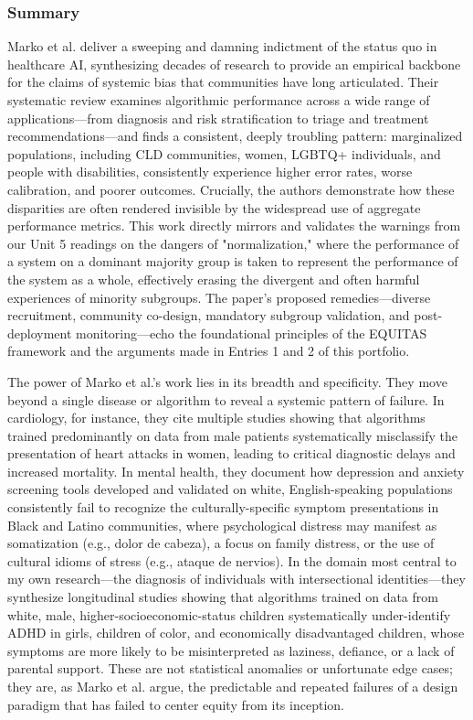 \documentclass[11pt,twoside]{article}
\begin{document}
\vspace{-0.3cm}
\subsubsection*{Summary}

\vspace{-0.3cm}
Marko et al. deliver a sweeping and damning indictment of the status quo in healthcare AI, synthesizing decades of research to provide an empirical backbone for the claims of systemic bias that communities have long articulated. Their systematic review examines algorithmic performance across a wide range of applications—from diagnosis and risk stratification to triage and treatment recommendations—and finds a consistent, deeply troubling pattern: marginalized populations, including CLD communities, women, LGBTQ+ individuals, and people with disabilities, consistently experience higher error rates, worse calibration, and poorer outcomes. Crucially, the authors demonstrate how these disparities are often rendered invisible by the widespread use of aggregate performance metrics. This work directly mirrors and validates the warnings from our Unit 5 readings on the dangers of "normalization," where the performance of a system on a dominant majority group is taken to represent the performance of the system as a whole, effectively erasing the divergent and often harmful experiences of minority subgroups. The paper’s proposed remedies—diverse recruitment, community co-design, mandatory subgroup validation, and post-deployment monitoring—echo the foundational principles of the EQUITAS framework and the arguments made in Entries 1 and 2 of this portfolio.

The power of Marko et al.'s work lies in its breadth and specificity. They move beyond a single disease or algorithm to reveal a systemic pattern of failure. In cardiology, for instance, they cite multiple studies showing that algorithms trained predominantly on data from male patients systematically misclassify the presentation of heart attacks in women, leading to critical diagnostic delays and increased mortality. In mental health, they document how depression and anxiety screening tools developed and validated on white, English-speaking populations consistently fail to recognize the culturally-specific symptom presentations in Black and Latino communities, where psychological distress may manifest as somatization (e.g., dolor de cabeza﻿), a focus on family distress, or the use of cultural idioms of stress (e.g., ataque de nervios﻿). In the domain most central to my own research—the diagnosis of individuals with intersectional identities—they synthesize longitudinal studies showing that algorithms trained on data from white, male, higher-socioeconomic-status children systematically under-identify ADHD in girls, children of color, and economically disadvantaged children, whose symptoms are more likely to be misinterpreted as laziness, defiance, or a lack of parental support. These are not statistical anomalies or unfortunate edge cases; they are, as Marko et al. argue, the predictable and repeated failures of a design paradigm that has failed to center equity from its inception.
\end{document}
